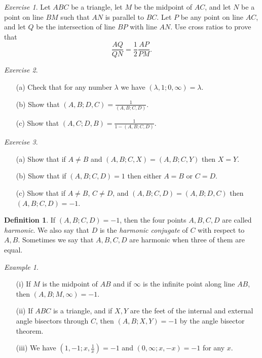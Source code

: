 \documentclass[letterpaper,11pt]{article}
\theoremstyle{definition}
\newtheorem{defn}{Definition}
\theoremstyle{remark}
\newtheorem{ex}{Example}
\newtheorem{exer}{Exercise}
\begin{document}
\begin{exer} Let $ABC$ be a triangle, let $M$ be the midpoint of $AC$, and let $N$ be a point on line $BM$ such that $AN$ is parallel to $BC$. Let $P$ be any point on line $AC$, and let $Q$ be the intersection of line $BP$ with line $AN$. Use cross ratios to prove that
\[
\frac{AQ}{QN} = \frac{1}{2}\frac{AP}{PM}.
\]
\end{exer}

\begin{exer}
\begin{itemize}
\item[(a)] Check that for any number $\lambda$ we have $(\lambda,1;0,\infty) = \lambda$.
\item[(b)] Show that $(A,B;D,C) = \frac{1}{(A,B;C,D)}$.
\item[(c)] Show that $(A,C;D,B) = \frac{1}{1-(A,B;C,D)}$.
\end{itemize}
\end{exer}

\begin{exer}
\begin{itemize}
\item[(a)] Show that if $A\ne B$ and $(A,B;C,X) = (A,B;C,Y)$ then $X=Y$.
\item[(b)] Show that if $(A,B;C,D) = 1$ then either $A=B$ or $C=D$.
\item[(c)] Show that if $A\ne B$, $C\ne D$, and $(A,B;C,D) = (A,B;D,C)$ then $(A,B;C,D) = -1$.
\end{itemize}
\end{exer}

\begin{defn} If $(A,B;C,D) = -1$, then the four points $A,B,C,D$ are called \emph{harmonic}. We also say that $D$ is the \emph{harmonic conjugate} of $C$ with respect to $A,B$. Sometimes we say that $A,B,C,D$ are harmonic when three of them are equal.
\end{defn}

\begin{ex}
\begin{itemize}
\item[(i)] If $M$ is the midpoint of $AB$ and if $\infty$ is the infinite point along line $AB$, then $(A,B;M,\infty) = -1$.

\item[(ii)] If $ABC$ is a triangle, and if $X,Y$ are the feet of the internal and external angle bisectors through $C$, then $(A,B;X,Y) = -1$ by the angle bisector theorem.

\item[(iii)] We have $(1,-1;x,\frac{1}{x}) = -1$ and $(0,\infty;x,-x) = -1$ for any $x$.
\end{itemize}
\end{ex}
\end{document}
